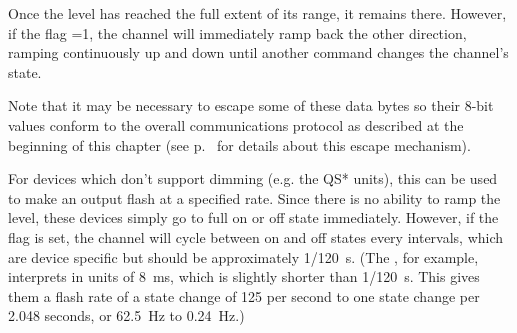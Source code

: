 \documentclass[letterpaper,twoside,onecolumn,openright,final]{memoir}
\begin{document}
Once the level has reached the full extent of its range, it remains there.  However, 
if the flag =1, the channel will immediately ramp back the other direction, ramping
continuously up and down until another command changes the channel's state.

Note that it may be necessary to escape some of these data bytes so their 8-bit values
conform to the overall communications protocol as described at the beginning of
this chapter (see p.~\pageref{escapebytes} for details about this escape mechanism).

\begin{QS*}
	For devices which don't support dimming (e.g. the QS* units), this can be used to
	make an output flash at a specified rate. Since there is no ability to ramp the level,
	these devices simply go to full on or off state immediately. However, if the  flag
	is set, the channel will cycle between on and off states every  intervals,
	which are device specific but should be approximately 1/120~s. (The , for example,
	interprets  in units of 8~ms, which is slightly shorter than 1/120~s. This gives
	them a flash rate of a state change of 125 per second to one state change per 2.048 seconds,
	or 62.5~Hz to 0.24~Hz.)
\end{QS*}
\end{document}
